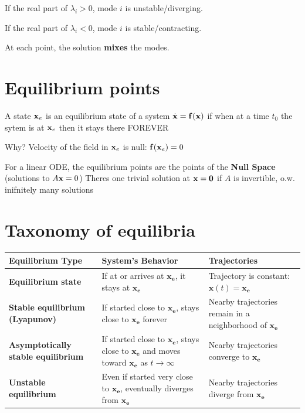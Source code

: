 If the real part of $\lambda_i > 0$, mode $i$ is unstable/diverging.

If the real part of $\lambda_i < 0$, mode $i$ is stable/contracting.

At each point, the solution \textbf{mixes} the modes.

\section*{Equilibrium points}

A state $\mathbf{x}_e$ is an equilibrium state of a system $\dot{\mathbf{x}} = \mathbf{f}(\mathbf{x})$ if 
when at a time $t_0$ the sytem is at $\mathbf{x}_e$ then it stays there FOREVER

Why? Velocity of the field in $\mathbf{x}_e$ is null: $\mathbf{f}(\mathbf{x}_e) = 0$


For a linear ODE, the equilibrium points are the points of the \textbf{Null Space} (solutions to $A \mathbf{x} = 0$)
Theres one trivial solution at $\mathbf{x} = \mathbf{0}$ if $A$ is invertible, o.w. inifnitely many solutions

\section*{Taxonomy of equilibria}

\begin{table}[h!]
\centering
\renewcommand{\arraystretch}{1.3}
\setlength{\tabcolsep}{8pt}
\begin{tabular}{>{\bfseries}m{3.5cm} m{6cm} m{5cm}}
\textbf{Equilibrium Type} & \textbf{System’s Behavior} & \textbf{Trajectories} \\ 
\midrule
Equilibrium state &
If at or arrives at $\mathbf{x_e}$, it stays at $\mathbf{x_e}$ &
Trajectory is constant: $\mathbf{x}(t) = \mathbf{x_e}$ \\

Stable equilibrium (Lyapunov) &
If started close to $\mathbf{x_e}$, stays close to $\mathbf{x_e}$ forever &
Nearby trajectories remain in a neighborhood of $\mathbf{x_e}$ \\

Asymptotically stable equilibrium &
If started close to $\mathbf{x_e}$, stays close to $\mathbf{x_e}$ and moves toward $\mathbf{x_e}$ as $t \to \infty$ &
Nearby trajectories converge to $\mathbf{x_e}$ \\

Unstable equilibrium &
Even if started very close to $\mathbf{x_e}$, eventually diverges from $\mathbf{x_e}$ &
Nearby trajectories diverge from $\mathbf{x_e}$ \\
\bottomrule
\end{tabular}
\end{table}

